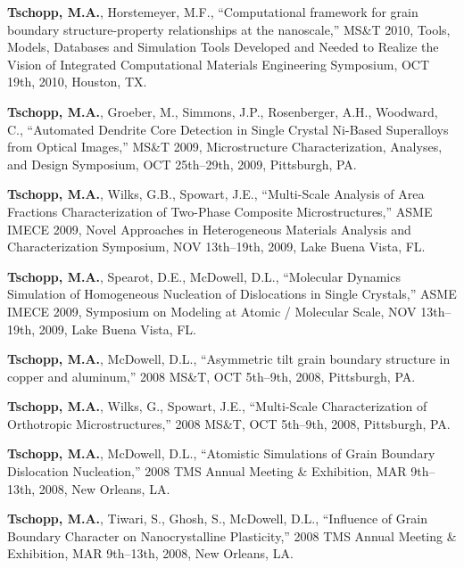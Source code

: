 \begin{cvlist}
\item
\textbf{Tschopp, M.A.}, Horstemeyer, M.F., ``Computational framework for grain boundary struc\-ture-property relationships at the nanoscale,'' MS\&T 2010, Tools, Models, Databases and Simulation Tools Developed and Needed to Realize the Vision of Integrated Computational Materials Engineering Symposium, OCT 19th, 2010, Houston, TX.

\item
\textbf{Tschopp, M.A.}, Groeber, M., Simmons, J.P., Rosenberger, A.H., Woodward, C., ``Automated Dendrite Core Detection in Single Crystal Ni-Based Superalloys from Optical Images,'' MS\&T 2009, Microstructure Characterization, Analyses, and Design Symposium, OCT 25th--29th, 2009, Pittsburgh, PA.

\item
\textbf{Tschopp, M.A.}, Wilks, G.B., Spowart, J.E., ``Multi-Scale Analysis of Area Fractions Characterization of Two-Phase Composite Microstructures,'' ASME IMECE 2009, Novel Approaches in Heterogeneous Materials Analysis and Characterization Symposium, NOV 13th--19th, 2009, Lake Buena Vista, FL.

\item
\textbf{Tschopp, M.A.}, Spearot, D.E., McDowell, D.L., ``Molecular Dynamics Simulation of Homogeneous Nucleation of Dislocations in Single Crystals,'' ASME IMECE 2009, Symposium on Modeling at Atomic / Molecular Scale, NOV 13th--19th, 2009, Lake Buena Vista, FL.

\item
\textbf{Tschopp, M.A.}, McDowell, D.L., ``Asymmetric tilt grain boundary structure in copper and aluminum,'' 2008 MS\&T, OCT 5th--9th, 2008, Pittsburgh, PA.

\item
\textbf{Tschopp, M.A.}, Wilks, G., Spowart, J.E., ``Multi-Scale Characterization of Orthotropic Microstructures,'' 2008 MS\&T, OCT 5th--9th, 2008, Pittsburgh, PA.

\item
\textbf{Tschopp, M.A.}, McDowell, D.L., ``Atomistic Simulations of Grain Boundary Dislocation Nucleation,'' 2008 TMS Annual Meeting \& Exhibition, MAR 9th--13th, 2008, New Orleans, LA.

\item
\textbf{Tschopp, M.A.}, Tiwari, S., Ghosh, S., McDowell, D.L., ``Influence of Grain Boundary Character on Nanocrystalline Plasticity,'' 2008 TMS Annual Meeting \& Exhibition, MAR 9th--13th, 2008, New Orleans, LA.


\end{cvlist}
